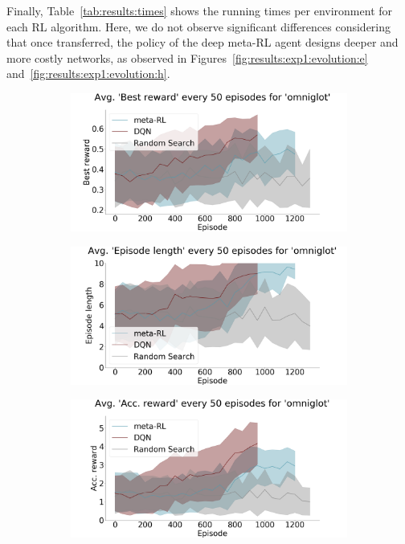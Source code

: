 Finally, Table~\ref{tab:results:times} shows the running times per environment for each RL algorithm. Here, we do not observe significant differences considering that once transferred, the policy of the deep meta-RL agent designs deeper and more costly networks, as observed in Figures~\ref{fig:results:exp1:evolution:e} and~\ref{fig:results:exp1:evolution:h}.

\begin{figure}[ht]
\centering
\begin{subfigure}{.33\textwidth}
  \centering
      \includegraphics[width=\linewidth]{imgs/chained/average-best_reward-omniglot.png}
  \caption{}
  \label{fig:results:exp1:evolution:a}
\end{subfigure}%
\begin{subfigure}{.33\textwidth}
  \centering
      \includegraphics[width=\linewidth]{imgs/chained/average-ep_length-omniglot.png}
  \caption{}
  \label{fig:results:exp1:evolution:b}
\end{subfigure}%
\begin{subfigure}{.33\textwidth}
  \centering
      \includegraphics[width=\linewidth]{imgs/chained/average-acc_reward-omniglot.png}

\end{subfigure}
\end{figure}
